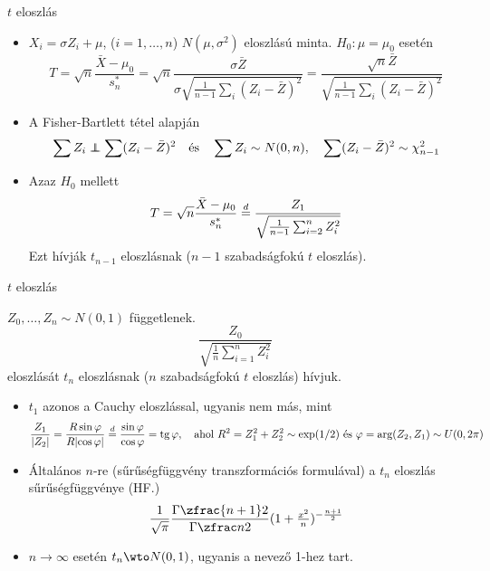 \documentclass[aspectratio=169,notheorems,9pt,\option]{beamer}
\begin{document}
\begin{frame}{$t$ eloszlás}

  \begin{itemize}
  \item $X_i=\sigma Z_i+\mu$, ($i=1,\dots,n$) $N (\mu,\sigma^2)$
    eloszlású minta. $H_0:\mu=\mu_0$ esetén
    \begin{displaymath}
      T=\sqrt{n}\frac{\bar{X}-\mu_0}{s^*_n}=\sqrt{n}\frac{\sigma \bar{Z}}{\sigma\sqrt{\frac1{n-1}\sum_i (Z_i-\bar{Z})^2}}=\frac{\sqrt{n}\bar{Z}}{\sqrt{\frac1{n-1}\sum_i (Z_i-\bar{Z})^2}}
    \end{displaymath}
  \item A Fisher-Bartlett tétel alapján
    \begin{displaymath}
      \sum Z_i\independent\sum (Z_i-\bar{Z})^2\quad\text{és}\quad \sum
      Z_i\sim N (0,n),\quad \sum (Z_i-\bar{Z})^2\sim \chi^2_{n-1}
    \end{displaymath}
  \item Azaz $H_0$ mellett
    \begin{displaymath}
      T=\sqrt{n}\frac{\bar{X}-\mu_0}{s^*_n}\stackrel{d}{=}\frac{Z_1}{\sqrt{\frac{1}{n-1}\sum_{i=2}^n Z_i^2}}
    \end{displaymath}
    Ezt hívják $t_{n-1}$ eloszlásnak ($n-1$ szabadságfokú $t$
    eloszlás).
  \end{itemize}
\end{frame}

\begin{frame}{$t$ eloszlás}
  \begin{df}
    $Z_0,\dots,Z_n\sim N (0,1)$ függetlenek.
    \begin{displaymath}
      \frac{Z_0}{\sqrt{\frac1n\sum_{i=1}^n Z_i^2}}
    \end{displaymath}
    eloszlását $t_n$ eloszlásnak ($n$ szabadságfokú $t$ eloszlás) hívjuk.
  \end{df}
  \begin{itemize}
  \item $t_1$ azonos a Cauchy eloszlással, ugyanis nem más, mint
    \begin{displaymath}
      \frac{Z_1}{\abs{Z_2}}=\frac{R\sin\phi}{R\abs{\cos\phi}}\eqinlaw
      \frac{\sin\phi}{\cos\phi}=\tg\phi,\quad\text{ahol
        $R^2=Z_1^2+Z_2^2\sim\exp (1/2)$ és $\phi=\arg (Z_2,Z_1)\sim U (0,2\pi)$}
    \end{displaymath}
  \item Általános $n$-re (sűrűségfüggvény transzformációs formulával)
    a $t_n$ eloszlás sűrűségfüggvénye (HF.)
    \begin{displaymath}
      \frac{1}{\sqrt{\pi}}\frac{\Gamma\zfrac{n+1}2}{\Gamma\zfrac n2} \zjel{1+\tfrac{x^2}n}^{-\frac{n+1}2}
    \end{displaymath}
  \item $n\to\infty$ esetén $t_n\wto N (0,1)$, ugyanis a nevező 1-hez tart.
  \end{itemize}
  
\end{frame}
\end{document}
